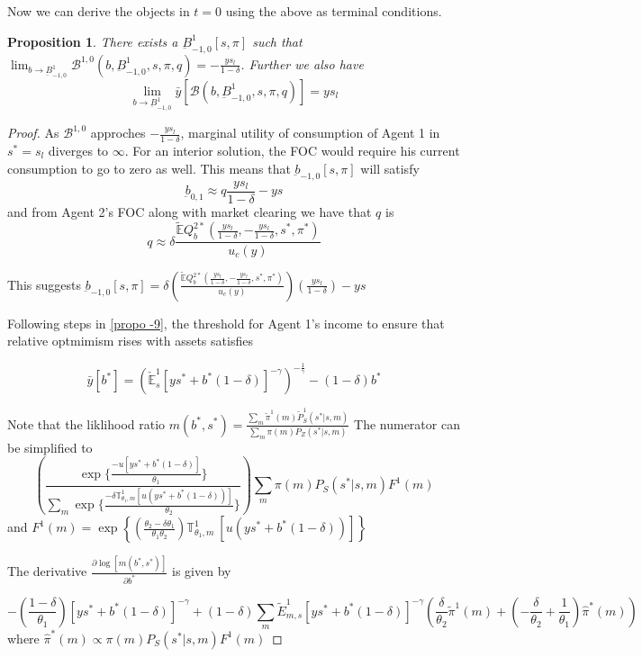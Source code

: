 \documentclass[12pt]{article}
\newtheorem{proposition}{Proposition}
\begin{document}
Now we can derive the objects in $t=0$ using the above as terminal conditions. 
\begin{proposition}
\label{propo-10}
There exists a $\underbar{B}^1_{-1,0}[s,\pi]$ such that $\lim_{b\to \underbar{B}^1_{-1,0}} \mathcal{B}^{1,0}(b,\underbar{B}^1_{-1,0},s,\pi,q) = -\frac{ys_l}{1-\delta}$. Further we also have 
\[\lim_{b \to \underbar{B}^1_{-1,0}}\bar{y}[\mathcal{B}(b,\underbar{B}^1_{-1,0},s,\pi,q)] = ys_l\]
\end{proposition}
%
\begin{proof}
As $\mathcal{B}^{1,0}$ approches $-\frac{ys_l}{1-\delta}$, marginal utility of consumption of Agent 1 in $s^*=s_l$ diverges to $\infty$. For an interior solution, the FOC would require his current consumption to go to zero as well. This means that $\underbar{b}_{-1,0}[s,\pi]$ will satisfy
\[\underbar{b}_{0,1} \approx q \frac{ys_l}{1-\delta}-ys \]
and from Agent 2's FOC along with market clearing we have that $q$ is
\[q \approx \delta \frac{\tilde{\mathbb{E}}Q_b^{2*}(\frac{ys_l}{1-\delta},-\frac{ys_l}{1-\delta},s^*,\pi^*)}{u_c(y)}\]

This suggests $\underbar{b}_{-1,0}[s,\pi]=  \delta\left(  \frac{\tilde{\mathbb{E}}Q_b^{2*}(\frac{ys_l}{1-\delta},-\frac{ys_l}{1-\delta},s^*,\pi^*)}{u_c(y)}\right)\left(\frac{ys_l}{1-\delta}\right)-ys$

Following steps in \ref{propo -9}, the threshold for Agent 1's income to ensure that relative optmimism rises with assets satisfies 

\[\bar{y}[b^*]=\left(\check{\mathbb{E}}^{1}_{s} [ys^{*}+b^*(1-\delta)]^{-\gamma}\right)^{-\frac{1}{\gamma}} -(1-\delta)b^*\]

Note that the liklihood ratio $m(b^*,s^*)=\frac{\sum_{m} \tilde{\pi}^1(m)\tilde{P}^1_S(s^*|s,m)}{\sum_{m}{\pi(m)P_Z(s^*|s,m)}}$
The numerator can be simplified to
\[\left(\frac{\exp\{\frac{-u[ys^*+b^*(1-\delta)]}{\theta_1}\}}{\sum_{m} \exp\{\frac{-\delta \mathbb{T}^1_{\theta_1,m}[u(ys^*+b^*(1-\delta))]}{\theta_2}\}}\right)\sum_{m}{\pi(m)P_S(s^*|s,m) F^1(m)}\]
and $F^1(m)=\exp\left\{ \left( \frac{\theta_2-\delta \theta_1}{\theta_1\theta_2}\right)\mathbb{T}^1_{\theta_1,m}\  [u(ys^*+b^*(1-\delta))]\right\}$

The derivative  $\frac{\partial \log[m(b^*,s^*)]}{\partial b^*}$ is given by 

\[-\left( \frac{1-\delta}{\theta_1}\right) [ys^*+b^*(1-\delta)]^{-\gamma}+ (1-\delta) \sum_{m} \tilde{E}^1_{m,s}[ys^*+b^*(1-\delta)]^{-\gamma} \left( \frac{\delta}{\theta_2} \tilde{\pi}^1(m)+\left(-\frac{\delta}{\theta_2} +\frac{1}{\theta_1}\right) \hat{\pi}^{*}(m) \right) \]
where $\hat{\pi}^{*}(m) \propto \pi(m)P_S(s^*|s,m)F^1(m)$


\end{proof}
\end{document}

